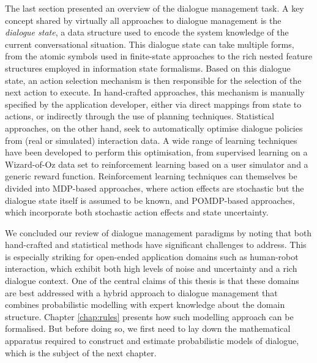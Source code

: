 The last section presented an overview of the dialogue management task. A key concept shared by virtually all approaches to dialogue management is the \textit{dialogue state}, a data structure used to encode the system knowledge of the current conversational situation.  This dialogue state can take multiple forms, from the atomic symbols used in finite-state approaches to the rich nested feature structures employed in information state formalisms. Based on this dialogue state, an action selection mechanism is then responsible for the selection of the next action to execute.  In hand-crafted approaches, this mechanism is manually specified by the application developer, either via direct mappings from state to actions, or indirectly through the use of planning techniques.  Statistical approaches, on the other hand, seek to automatically optimise dialogue policies from (real or simulated) interaction data.  A wide range of learning techniques have been developed to perform this optimisation, from supervised learning on a Wizard-of-Oz data set to reinforcement learning based on a user simulator and a generic reward function.   Reinforcement learning techniques can themselves be divided into MDP-based approaches, where action effects are stochastic but the dialogue state itself is assumed to be known, and POMDP-based approaches, which incorporate both stochastic action effects and state uncertainty.

We concluded our review of dialogue management paradigms by noting that both hand-crafted and statistical methods have significant challenges to address.  This is especially striking for open-ended application domains such as human-robot interaction, which exhibit both high levels of noise and uncertainty and a rich dialogue context.   One of the central claims of this thesis is that these domains are best addressed with a hybrid approach to dialogue management that combines probabilistic modelling with expert knowledge about the domain structure.  Chapter \ref{chap:rules} presents how such modelling approach can be formalised.  But before doing so, we first need to lay down the mathematical apparatus required to construct and estimate probabilistic models of dialogue, which is the subject of the next chapter.

